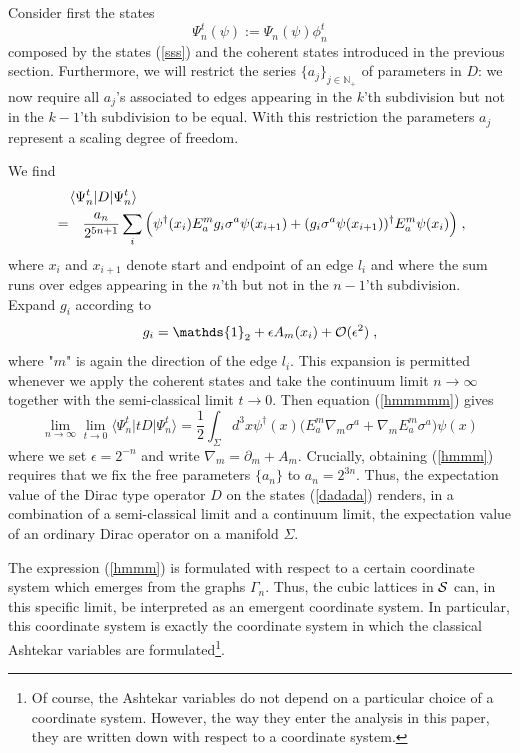 \documentclass[12pt]{article}
\newcommand{\nn}{\nonumber}
\def\e{\epsilon}
\def\G{\Gamma}
\def\co{{\cal O}}
\def\cs{{\cal S}}
\newcommand{\pa}{\partial}
\begin{document}
 Consider first the states
\begin{equation}
\Psi^t_n(\psi) :=  \Psi_{n}(\psi)  \phi^t_n
\label{dadada}
\end{equation}
composed by the states (\ref{sss}) and the coherent states introduced in the previous section. Furthermore, we will restrict the series $\{a_j\}_{j\in\mathbb{N}_+}$ of parameters in $D$: we now require all $a_j$'s associated to edges appearing in the $k$'th subdivision but not in the $k-1$'th subdivision to be equal. With this restriction the parameters $a_j$ represent a scaling degree of freedom.

We find %
\begin{eqnarray}
\langle \Psi^t_n\vert  D \vert \Psi^t_n\rangle \hspace{-2.1cm} &&
 \nn\\&=&
 \frac{a_n}{2^{5n+1}} 
 \sum_i \Big(  \psi^\dagger(x_i)  E^m_a g_{i}\sigma^a  \psi(x_{i+1}) +(g_{i} \sigma^a  {\psi}(x_{i+1}))^\dagger  E^m_a \psi(x_{i}) 
 \Big)\;,
 \label{hmmmmm}
\end{eqnarray}
where $x_i$ and $x_{i+1}$ denote start and endpoint of an edge $l_i$ and where the sum runs over edges appearing in the $n$'th but not in the $n-1$'th subdivision. Expand $g_{i}$ according to
$$
g_{i}= \mathds{1}_2 + \e A_m(x_i) +\co(\e^2)\;,
$$
where "$m$" is again the direction of the edge  $l_i$. This expansion is permitted whenever we apply the coherent states and take the continuum limit $n\rightarrow\infty$ together with the semi-classical limit $t\rightarrow 0$. Then equation (\ref{hmmmmm}) gives
\begin{equation}
\lim_{n\rightarrow\infty}\lim_{t\rightarrow 0} \langle \Psi^t_n\vert t D \vert \Psi^t_n\rangle =
 \frac{1}{2}  \int_\Sigma d^3x  {\psi}^\dagger(x) \Big( E^m_a \nabla_m \sigma^a  + \nabla_m E^m_a  \sigma^a    \Big) \psi(x) 
 \label{hmmm}
\end{equation}
where we set $\e=2^{-n}$ and write $\nabla_m=\pa_m+ A_m$. Crucially, obtaining (\ref{hmmm}) requires that we fix the free parameters $\{a_n\}$ to $a_n= 2^{3n}$.
Thus, the expectation value of the Dirac type operator $D$ on the states (\ref{dadada}) renders, in a combination of a semi-classical limit and a continuum limit, the expectation value of an ordinary Dirac operator on a manifold $\Sigma$. 

The expression (\ref{hmmm}) is formulated with respect to a certain coordinate system which emerges from the graphs $\G_n$. Thus, the cubic lattices in $\cs$ can, in this specific limit, be interpreted as an emergent coordinate system. In particular, this coordinate system is exactly the coordinate system in which the classical Ashtekar variables are formulated\footnote{Of course, the Ashtekar variables do not depend on a particular choice of a coordinate system. However, the way they enter the analysis in this paper, they are written down with respect to a coordinate system.}. 
\end{document}
